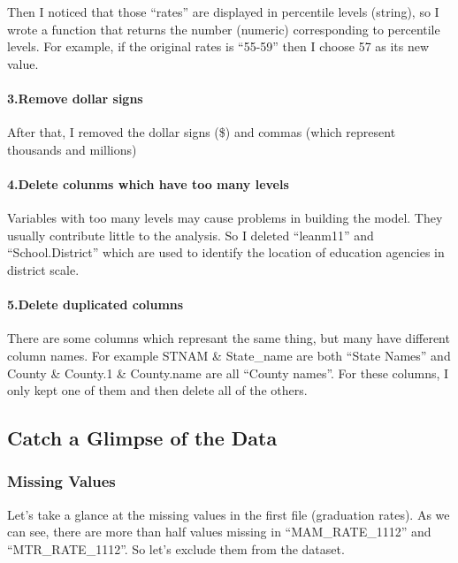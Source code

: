 \documentclass[]{article}
\begin{document}
Then I noticed that those ``rates'' are displayed in percentile levels
(string), so I wrote a function that returns the number (numeric)
corresponding to percentile levels. For example, if the original rates
is ``55-59'' then I choose 57 as its new value.

\paragraph{3.Remove dollar signs}\label{remove-dollar-signs}

After that, I removed the dollar signs (\$) and commas (which represent
thousands and millions)

\paragraph{4.Delete colunms which have too many
levels}\label{delete-colunms-which-have-too-many-levels}

Variables with too many levels may cause problems in building the model.
They usually contribute little to the analysis. So I deleted ``leanm11''
and ``School.District'' which are used to identify the location of
education agencies in district scale.

\paragraph{5.Delete duplicated columns}\label{delete-duplicated-columns}

There are some columns which represant the same thing, but many have
different column names. For example STNAM \& State\_name are both
``State Names'' and County \& County.1 \& County.name are all ``County
names''. For these columns, I only kept one of them and then delete all
of the others.

\subsection{Catch a Glimpse of the
Data}\label{catch-a-glimpse-of-the-data}

\subsubsection{Missing Values}\label{missing-values}

Let's take a glance at the missing values in the first file (graduation
rates). As we can see, there are more than half values missing in
``MAM\_RATE\_1112'' and ``MTR\_RATE\_1112''. So let's exclude them from
the dataset.
\end{document}
